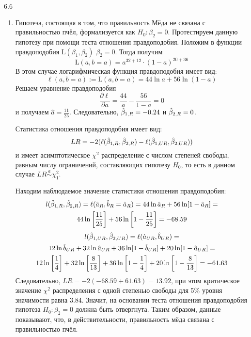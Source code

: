 \begin{solution}{{6.6}}
\begin{enumerate}
\[
\begin{cases}
\frac{\partial \ell}{\partial a} = \frac{32}{a} - \frac{20}{1 - a} = 0 \\
\frac{\partial \ell}{\partial b} = \frac{12}{b} - \frac{36}{1 - b} = 0 \\
\end{cases}
\]
получаем $\hat{a} = \frac{8}{13}$, $\hat{b} = \frac{1}{4}$. Находим $\hb_{1, UR} = \ln\left( \frac{\hat{a}}{1 - \hat{a}} \right)= \ln \left(\frac{8}{5} \right) = 0.47$. Далее получаем, что $\hb_{1, UR} + \hb_{2, UR} = \ln \left( \frac{\hat{b}}{1 - \hat{b}} \right)$. Следовательно, $\hb_{2, UR} = \ln \left( \frac{\hat{b}}{1 - \hat{b}} \right) - \hb_{1, UR} = \ln \left( \frac{1}{3} \right) - \ln \left( \frac{8}{5} \right) = -1.57$.

\item Гипотеза, состоящая в том, что правильность Мёда не связана с правильностью
пчёл, формализуется как $H_0: \beta_2 = 0$. Протестируем данную гипотезу при помощи теста
отношения правдоподобия. Положим в функции правдоподобия $\text{L}(\beta_1, \beta_2)$ $\beta_2 = 0$. Тогда получим
\[
\text{L}(a, b=a) = a^{32+12} \cdot (1-a)^{20+36}
\]
В этом случае логарифмическая функция правдоподобия имеет вид:
\[
\ell(a, b=a) := \text{L}(a, b=a) = 44 \ln a + 56 \ln(1-a)
\]
Решаем уравнение правдоподобия
\[
\frac{\partial \ell}{\partial a} = \frac{44}{a} - \frac{56}{1 - a} = 0
\]
и получаем $\hat{a} = \frac{11}{25}$. Следовательно, $\hat{\beta}_{1, R} = -0.24$ и $\hat{\beta}_{2, R} = 0$.

Статистика отношения правдоподобия имеет вид:
\[
LR = -2(\ell(\hat{\beta}_{1, R}, \hat{\beta}_{2, R}) - \ell(\hat{\beta}_{1, UR}, \hat{\beta}_{2, UR}))
\]
и имеет асимптотическое $\chi^2$ распределение с числом степеней свободы, равным числу ограничений, составляющих гипотезу $H_0$, то есть в данном случае $LR \overset{a}{\sim} \chi^2_1$.

Находим наблюдаемое значение статистики отношения правдоподобия:
\begin{multline*}
l(\hat{\beta}_{1, R}, \hat{\beta}_{2, R}) = \ell(\hat{a}_R, \hat{b}_R = \hat{a}_R) = 44\ln\hat{a}_R + 56\ln[1-\hat{a}_R] =\\
 44\ln \left[ \frac{11}{25} \right] + 56\ln \left[ 1 - \frac{11}{25} \right] = -68.59
\end{multline*}
\begin{multline*}
l(\hat{\beta}_{1, UR}, \hat{\beta}_{2, UR}) = \ell(\hat{a}_{UR}, \hat{b}_{UR}) =\\
 12\ln \hat{b}_{UR} + 32 \ln \hat{a}_{UR} + 36\ln[1 - \hat{b}_{UR}] + 20\ln[1 - \hat{a}_{UR}] = \\
12\ln \left[ \frac{1}{4} \right] + 32\ln \left[ \frac{8}{13} \right] + 36\ln \left[ 1 - \frac{1}{4} \right] + 20\ln \left[1 - \frac{8}{13} \right] = -61.63
\end{multline*}
Следовательно, $LR = -2(-68.59 + 61.63) = 13.92$, при этом критическое значение $\chi^2$ распределения с одной степенью свободы для 5\% уровня значимости равна 3.84. Значит, на основании теста отношения правдоподобия гипотеза $H_0: \beta_2 = 0$ должна быть отвергнута. Таким образом, данные показывают, что, в действительности, правильность мёда связана с правильностью пчёл.


\end{enumerate}
\end{solution}
